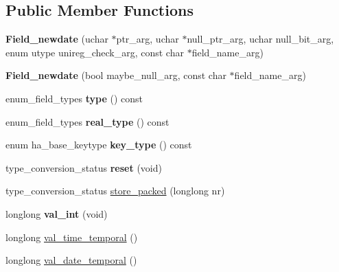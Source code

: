 \subsection*{Public Member Functions}
\begin{DoxyCompactItemize}
\item 
\mbox{\label{classField__newdate_a977297dc4f1716a4f1450f66fdd6fb25}} 
{\bfseries Field\+\_\+newdate} (uchar $\ast$ptr\+\_\+arg, uchar $\ast$null\+\_\+ptr\+\_\+arg, uchar null\+\_\+bit\+\_\+arg, enum utype unireg\+\_\+check\+\_\+arg, const char $\ast$field\+\_\+name\+\_\+arg)
\item 
\mbox{\label{classField__newdate_a22f4e4b567c7659a708d970a3ff0cdb8}} 
{\bfseries Field\+\_\+newdate} (bool maybe\+\_\+null\+\_\+arg, const char $\ast$field\+\_\+name\+\_\+arg)
\item 
\mbox{\label{classField__newdate_a5bfdca969e5af0aa81c41b65a806f390}} 
enum\+\_\+field\+\_\+types {\bfseries type} () const
\item 
\mbox{\label{classField__newdate_a69295a595a359e06f76153f4b38f3fbd}} 
enum\+\_\+field\+\_\+types {\bfseries real\+\_\+type} () const
\item 
\mbox{\label{classField__newdate_a808c035b42e8e2f47a46c4bb1825dc6c}} 
enum ha\+\_\+base\+\_\+keytype {\bfseries key\+\_\+type} () const
\item 
\mbox{\label{classField__newdate_a92b4afa594268e175fce27c1ad288430}} 
type\+\_\+conversion\+\_\+status {\bfseries reset} (void)
\item 
type\+\_\+conversion\+\_\+status \mbox{\hyperlink{classField__newdate_a4f741d8531290394ba08ee165498e830}{store\+\_\+packed}} (longlong nr)
\item 
\mbox{\label{classField__newdate_aa3bef011d319354c14c25a991a8b6bf9}} 
longlong {\bfseries val\+\_\+int} (void)
\item 
longlong \mbox{\hyperlink{classField__newdate_aad085aaff8fef3367986f9733b79605c}{val\+\_\+time\+\_\+temporal}} ()
\item 
longlong \mbox{\hyperlink{classField__newdate_a06c3392cc8329a524f544360d789fc3d}{val\+\_\+date\+\_\+temporal}} ()

\end{DoxyCompactItemize}
